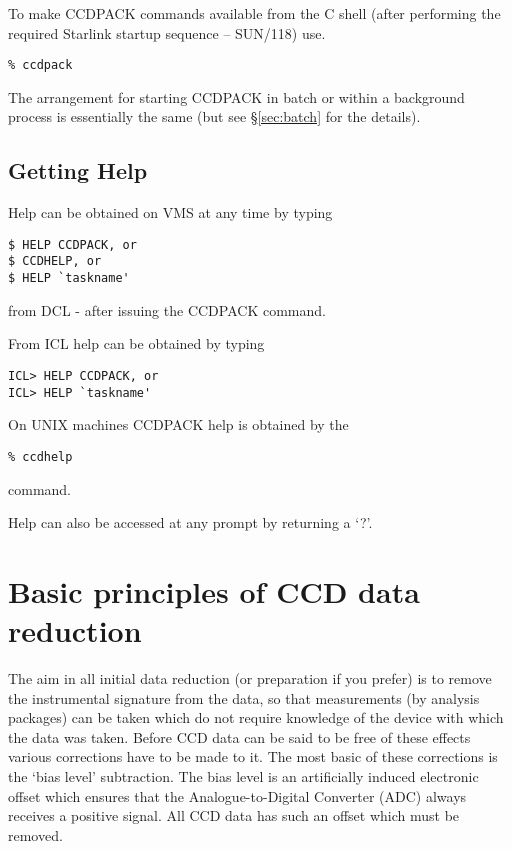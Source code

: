 To make CCDPACK commands available from the C shell (after performing
the required Starlink startup sequence -- SUN/118) use.
\begin{myquote}
\begin{verbatim}
% ccdpack
\end{verbatim}
\end{myquote}

The arrangement for starting CCDPACK in batch or within a background
process is essentially the same (but see \S\ref{sec:batch} for the 
details).

\subsection{Getting Help}

Help can be obtained on VMS at any time by typing
\begin{myquote}
\begin{verbatim}
$ HELP CCDPACK, or
$ CCDHELP, or
$ HELP `taskname'
\end{verbatim}
\end{myquote}
from DCL - after issuing the CCDPACK command.

From ICL help can be obtained by typing
\begin{myquote}
\begin{verbatim}
ICL> HELP CCDPACK, or
ICL> HELP `taskname'
\end{verbatim}
\end{myquote}

On UNIX machines CCDPACK help is obtained by the 

\begin{myquote}
\begin{verbatim}
% ccdhelp
\end{verbatim}
\end{myquote}

command.

Help can also be accessed at any prompt by returning a `?'.

\section{Basic principles of CCD data reduction}

The aim in all initial data reduction (or preparation if you prefer) is
to remove the instrumental signature from the data, so that measurements
(by analysis packages) can be taken which do not require knowledge of
the device with which the data was taken. Before CCD data can be said to
be free of these effects various corrections have to be made to it. The
most basic of these corrections is the `bias level' subtraction. The
bias level is an artificially induced electronic offset which ensures
that the Analogue-to-Digital Converter (ADC) always receives a positive
signal. All CCD data has such an offset which must be removed.

